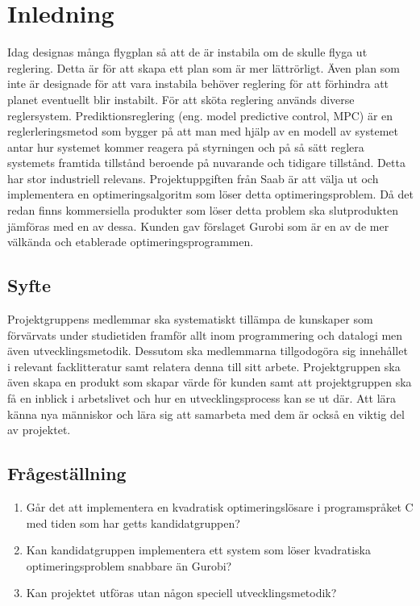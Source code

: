 \section{Inledning}
Idag designas många flygplan så att de är instabila om de skulle flyga ut reglering. Detta är för att skapa ett plan som är mer lättrörligt. Även plan som inte är designade för att vara instabila behöver reglering för att förhindra att planet eventuellt blir instabilt. För att sköta reglering används diverse reglersystem. \citep{airplanestability}
\newline
\newline
Prediktionsreglering (eng. model predictive control, MPC) är en reglerleringsmetod som 
bygger på att man med hjälp av en modell av systemet antar hur systemet kommer reagera på styrningen och på så sätt reglera systemets framtida tillstånd beroende på nuvarande och tidigare tillstånd. Detta har stor industriell relevans. \citep[2]{ir}
\newline
\newline
Projektuppgiften från Saab är att välja ut och implementera en optimeringsalgoritm som löser detta optimeringsproblem. Då det redan finns kommersiella produkter som löser detta problem ska slutprodukten jämföras med en av dessa. Kunden gav förslaget Gurobi som är en av de mer välkända och etablerade optimeringsprogrammen.

\subsection{Syfte}
Projektgruppens medlemmar ska systematiskt tillämpa de kunskaper som förvärvats under studietiden framför allt inom programmering och datalogi men även utvecklingsmetodik. Dessutom ska medlemmarna tillgodogöra sig innehållet i relevant facklitteratur samt relatera denna till sitt arbete. 
Projektgruppen ska även skapa en produkt som skapar värde för kunden samt att projektgruppen ska få en inblick i arbetslivet och hur en utvecklingsprocess kan se ut där. Att lära känna nya människor och lära sig att samarbeta med dem är också en viktig del av projektet.


\subsection{Frågeställning}
	\begin{enumerate}
		\item Går det att implementera en kvadratisk optimeringslösare i programspråket C med tiden som har getts kandidatgruppen?
		\item Kan kandidatgruppen implementera ett system som löser kvadratiska optimeringsproblem snabbare än Gurobi?
		\item Kan projektet utföras utan någon speciell utvecklingsmetodik? 
	\end{enumerate}

